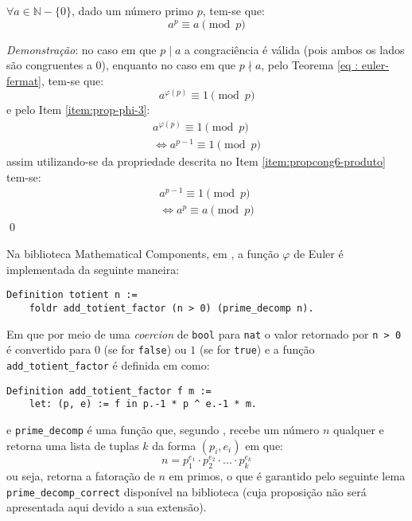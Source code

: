 \begin{teorema}
\label{eq : pequeno-fermat}
$\forall a \in \mathbb{N} - \{0\}$, dado um número primo $p$, tem-se que:
    \begin{equation*}
        a^p \equiv a \pmod{p}
    \end{equation*}
\end{teorema}

\noindent
\textit{Demonstração}: no caso em que $p \mid a$ a congraciência é válida (pois ambos os lados são congruentes a $0$), enquanto no caso em que $p \nmid a$, pelo Teorema \ref{eq : euler-fermat}, tem-se que:
\begin{equation*}
    a^{\varphi(p)} \equiv 1 \pmod{p}
\end{equation*}
e pelo Item \ref{item:prop-phi-3}:
\begin{align*}
    a^{\varphi(p)} \equiv 1 \pmod{p}
    \\
    \Longleftrightarrow a^{p-1} \equiv 1 \pmod{p}
\end{align*}
assim utilizando-se da propriedade descrita no Item \ref{item:propcong6-produto} tem-se:
\begin{align*}
    a^{p-1} \equiv 1 \pmod{p}
    \\
    \Longleftrightarrow a^{p} \equiv a \pmod{p}
\end{align*} \qed

Na biblioteca Mathematical Components, em \cite{mathcomp-prime}, a função $\varphi$ de Euler é implementada da seguinte maneira:
\begin{lstlisting}[language=coq,frame=single,tabsize=1]
Definition totient n := 
    foldr add_totient_factor (n > 0) (prime_decomp n).
\end{lstlisting}
Em que por meio de uma \textit{coercion} de \lstinline[language = coq]{bool} para \lstinline[language = coq]{nat} o valor retornado por \lstinline[language = coq]{n > 0} é convertido para $0$ (se for \lstinline[language = coq]{false}) ou $1$ (se for \lstinline[language = coq]{true}) e a função \lstinline[language = coq]{add_totient_factor} é definida em \cite{mathcomp-prime} como:
\begin{lstlisting}[language=coq,frame=single,tabsize=1]
Definition add_totient_factor f m := 
    let: (p, e) := f in p.-1 * p ^ e.-1 * m.
\end{lstlisting}
e \lstinline[language = coq]{prime_decomp} é uma função que, segundo \cite{mathcomp-prime}, recebe um número $n$ qualquer e retorna uma lista de tuplas $k$ da forma $(p_i, e_i)$ em que:
    \begin{equation*}
        n = p_1^{e_1} \cdot p_2^{e_2} \cdot ... \cdot p_k^{e_k}
    \end{equation*}
ou seja, retorna a fatoração de $n$ em primos, o que é garantido pelo seguinte lema \lstinline[language = coq]{prime_decomp_correct} disponível na biblioteca (cuja proposição não será apresentada aqui devido a sua extensão).

